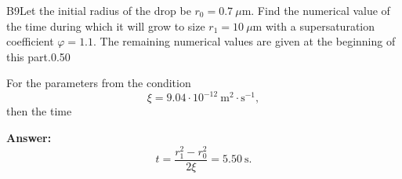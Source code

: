 \documentclass[11pt,a4paper]{article}
\begin{document}
\begin{solcard}{B9}{Let the initial radius of the drop be $r_0 = 0.7~\mu\text{m}$. Find the numerical value of the time during which it will grow to size $r_1 = 10~\mu\text{m}$ with a supersaturation coefficient $\varphi = 1.1$. The remaining numerical values are given at the beginning of this part.}{0.50}

For the parameters from the condition $$ \xi = 9.04 \cdot 10^{-12} ~\text{m}^2 \cdot \text{s}^{-1}, $$then the time

\par\smallskip\noindent\textbf{Answer:} $$ t = \frac{r_1^2 - r_0^2}{2 \xi} = 5.50~\text{s}. $$
\end{solcard}
\end{document}

